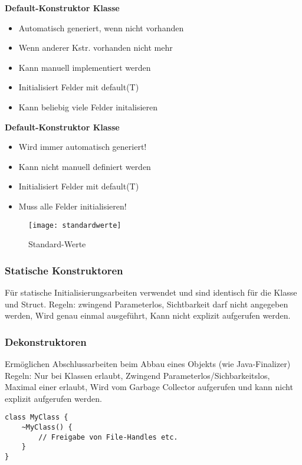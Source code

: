 \begin{minipage}{0,5\linewidth}
\textbf{Default-Konstruktor Klasse}
\begin{itemize}
  \itemsep -0.5em 
  \item Automatisch generiert, wenn nicht vorhanden
  \item Wenn anderer Kstr. vorhanden nicht mehr
  \item Kann manuell implementiert werden
  \item Initialisiert Felder mit default(T)
  \item Kann beliebig viele Felder initalisieren
\end{itemize}
\end{minipage}
\begin{minipage}{0,5\linewidth}
\textbf{Default-Konstruktor Klasse}
\begin{itemize}
  \itemsep -0.5em 
  \item Wird immer automatisch generiert!
  \item Kann nicht manuell definiert werden
  \item Initialisiert Felder mit default(T)
  \item Muss alle Felder initialisieren!
\end{itemize}
\end{minipage}

\begin{figure}[h!]
	\centering
  	\texttt{[image: standardwerte]}
    \caption{Standard-Werte}
\end{figure}

\subsubsection{Statische Konstruktoren}
Für statische Initialisierungsarbeiten verwendet und sind identisch für die Klasse und Struct. Regeln: zwingend Parameterlos, Sichtbarkeit darf nicht angegeben werden, Wird genau einmal ausgeführt, Kann nicht explizit aufgerufen werden.

\subsubsection{Dekonstruktoren}
Ermöglichen Abschlussarbeiten beim Abbau eines Objekts (wie Java-Finalizer) Regeln: Nur bei Klassen erlaubt, Zwingend Parameterlos/Sichbarkeitslos, Maximal einer erlaubt, Wird vom Garbage Collector aufgerufen und kann nicht explizit aufgerufen werden.
\begin{lstlisting}
class MyClass {
	~MyClass() {
		// Freigabe von File-Handles etc.
	}
}
\end{lstlisting}

